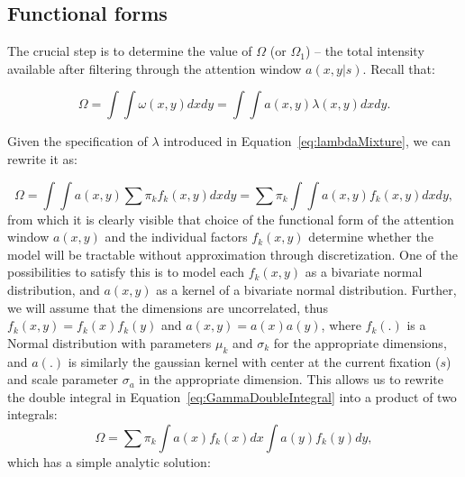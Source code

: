 \documentclass{article}
\begin{document}
\subsection{Functional forms}

The crucial step is to determine the value of $\Omega$ (or $\Omega_1$) -- the total intensity available after filtering through the attention window $a(x, y |
s)$. Recall that: 

\begin{equation}
    \Omega = \int \int \omega(x, y) dx dy=  \int \int a(x, y) \lambda(x, y)dx dy.
\end{equation}

Given the specification of $\lambda$ introduced in Equation~\ref{eq:lambdaMixture}, we can rewrite it as:

\begin{equation}
\label{eq:GammaDoubleIntegral}
    \Omega = \int \int a(x, y) \sum \pi_k f_k(x, y) dx dy = \sum \pi_k \int \int a(x, y) f_k(x, y) dx dy,
\end{equation}
from which it is clearly visible that choice of the functional form of the attention window $a(x, y)$ and the individual factors $f_k(x, y)$ determine whether the model will be tractable without approximation through discretization. One of the possibilities to satisfy this is to model each $f_k(x, y)$ as a bivariate normal distribution, and $a(x, y)$ as a kernel of a bivariate normal distribution. Further, we will assume that the dimensions are uncorrelated, thus $f_k(x, y) = f_k(x)f_k(y)$ and $a(x, y) = a(x)a(y)$, where $f_k(.)$ is a Normal distribution with parameters $\mu_k$ and $\sigma_k$ for the appropriate dimensions, and $a(.)$ is similarly the gaussian kernel with center at the current fixation ($s$) and scale parameter $\sigma_a$ in the appropriate dimension. This allows us to rewrite the double integral in Equation~\ref{eq:GammaDoubleIntegral} into a product of two integrals:
\begin{equation}
    \Omega =  \sum \pi_k \int a(x)f_k(x) dx \int a(y)f_k(y) dy, 
\end{equation}
which has a simple analytic solution:
\end{document}
